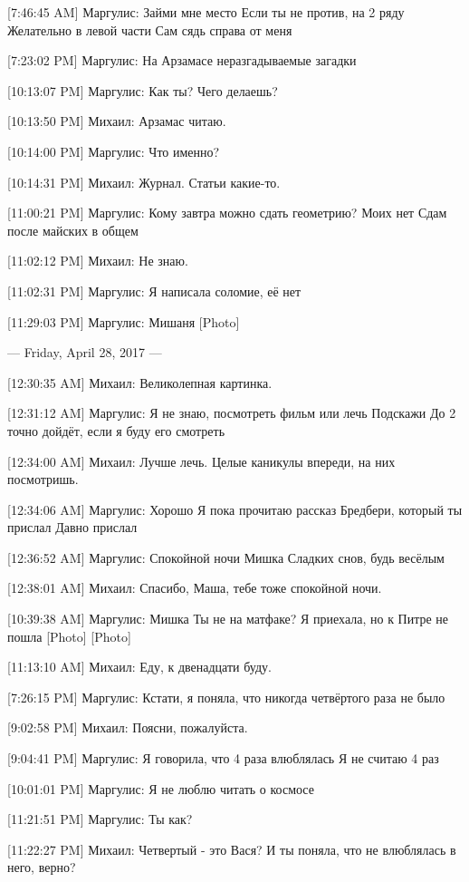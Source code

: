 \documentclass{article}
\begin{document}
[7:46:45 AM] Маргулис:
Займи мне место
 Если ты не против, на 2 ряду
 Желательно в левой части
 Сам сядь справа от меня

[7:23:02 PM] Маргулис:
На Арзамасе неразгадываемые загадки

[10:13:07 PM] Маргулис:
Как ты?
 Чего делаешь?

[10:13:50 PM] Михаил:
Арзамас читаю.

[10:14:00 PM] Маргулис:
Что именно?

[10:14:31 PM] Михаил:
Журнал. Статьи какие-то.

[11:00:21 PM] Маргулис:
Кому завтра можно сдать геометрию?
 Моих нет
 Сдам после майских в общем

[11:02:12 PM] Михаил:
Не знаю.

[11:02:31 PM] Маргулис:
Я написала соломие, её нет

[11:29:03 PM] Маргулис:
Мишаня
 [Photo]

--- Friday, April 28, 2017 ---

[12:30:35 AM] Михаил:
Великолепная картинка.

[12:31:12 AM] Маргулис:
Я не знаю, посмотреть фильм или лечь
 Подскажи
 До 2 точно дойдёт, если я буду его смотреть

[12:34:00 AM] Михаил:
Лучше лечь. Целые каникулы впереди, на них посмотришь.

[12:34:06 AM] Маргулис:
Хорошо
 Я пока прочитаю рассказ Бредбери, который ты прислал
 Давно прислал

[12:36:52 AM] Маргулис:
Спокойной ночи
 Мишка
 Сладких снов, будь весёлым

[12:38:01 AM] Михаил:
Спасибо, Маша, тебе тоже спокойной ночи.

[10:39:38 AM] Маргулис:
Мишка
 Ты не на матфаке?
 Я приехала, но к Питре не пошла
 [Photo]
 [Photo]

[11:13:10 AM] Михаил:
Еду, к двенадцати буду.

[7:26:15 PM] Маргулис:
Кстати, я поняла, что никогда четвёртого раза не было

[9:02:58 PM] Михаил:
Поясни, пожалуйста.

[9:04:41 PM] Маргулис:
Я говорила, что 4 раза влюблялась
 Я не считаю 4 раз

[10:01:01 PM] Маргулис:
Я не люблю читать о космосе

[11:21:51 PM] Маргулис:
Ты как?

[11:22:27 PM] Михаил:
Четвертый - это Вася? И ты поняла, что не влюблялась в него, верно?
\end{document}
